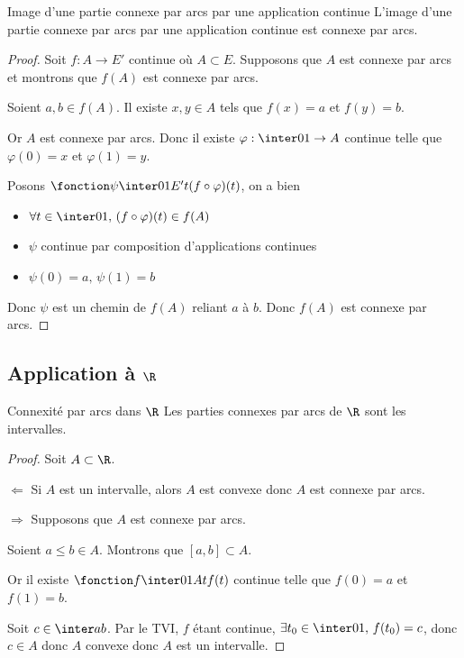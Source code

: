 \begin{theoreme}{Image d'une partie connexe par arcs par une application continue}{}
    L'image d'une partie connexe par arcs par une application continue est connexe par arcs.
\end{theoreme}

\begin{proof}
    Soit $f : A \to E'$ continue où $A \subset E$. Supposons que 
    $A$ est connexe par arcs et montrons que $f(A)$ est connexe par arcs. 

    Soient $a, b \in f(A)$. Il existe $x, y \in A$ tels que $f(x) = a$ et $f(y) = b$.
     
    Or $A$ est connexe par arcs. 
    Donc il existe $\varphi : \inter 0 1 \to A$ continue telle que $\varphi(0) = x$ et $\varphi(1) = y$.

    Posons $\fonction \psi {\inter 0 1}{E'} t { (f \circ \varphi)(t)}$, on a bien 

    \begin{itemize}
        \item $\forall t \in \inter 0 1, \, (f \circ \varphi) (t) \in f(A) $ 
        \item $\psi$ continue par composition d'applications continues
        \item $\psi(0) = a, \, \psi(1) = b$
    \end{itemize}

    Donc $\psi $ est un chemin de $f(A)$ reliant $a$ à $b$. Donc $f(A)$ est connexe par arcs.
\end{proof}

\subsection{Application à \texorpdfstring{$\R$}{R}}

\begin{theoreme}{Connexité par arcs dans $\R$}{}
    Les parties connexes par arcs de $\R$ sont les intervalles.
\end{theoreme}

\begin{proof}
    Soit $A \subset \R$. 

    $\Leftarrow$ Si $A$ est un intervalle, alors $A$ est convexe donc $A$ est connexe par arcs.

    $\Rightarrow$ Supposons que $A$ est connexe par arcs. 

    Soient $a \leqslant b \in A$. Montrons que $[a, b] \subset A$.

    Or il existe $\fonction f {\inter 0 1} A t {f(t)}$ continue telle que $f(0) = a$ et $f(1) = b$.

    Soit $c \in \inter a b$. Par le TVI, $f$ étant continue, $\exists t_0 \in \inter 0 1, \, f(t_0) = c$, 
    donc $c \in A$ donc $A$ convexe donc $A$ est un intervalle.
\end{proof}

